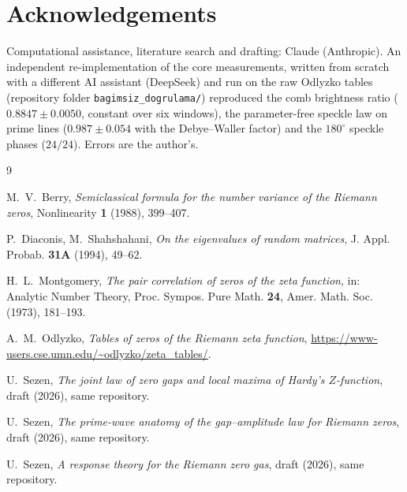 \documentclass[12pt]{amsart}
\begin{document}
\section*{Acknowledgements}

Computational assistance, literature search and drafting: Claude
(Anthropic). An independent re-implementation of the core measurements, written from
scratch with a different AI assistant (DeepSeek) and run on the raw
Odlyzko tables (repository folder \texttt{bagimsiz\_dogrulama/}) reproduced the comb brightness ratio
($0.8847 \pm 0.0050$, constant over six windows), the parameter-free
speckle law on prime lines ($0.987 \pm 0.054$ with the Debye--Waller
factor) and the $180^\circ$ speckle phases ($24/24$). Errors are the
author's.

\begin{thebibliography}{9}

 M.~V.~Berry, \emph{Semiclassical formula for the number
variance of the Riemann zeros}, Nonlinearity \textbf{1} (1988), 399--407.

 P.~Diaconis, M.~Shahshahani, \emph{On the eigenvalues of
random matrices}, J. Appl. Probab. \textbf{31A} (1994), 49--62.

 H.~L.~Montgomery, \emph{The pair correlation of
zeros of the zeta function}, in: Analytic Number Theory, Proc. Sympos.
Pure Math. \textbf{24}, Amer. Math. Soc. (1973), 181--193.

 A.~M.~Odlyzko, \emph{Tables of zeros of the
Riemann zeta function},
\url{https://www-users.cse.umn.edu/~odlyzko/zeta_tables/}.

 U.~Sezen, \emph{The joint law of zero gaps and local
maxima of Hardy's $Z$-function}, draft (2026), same repository.

 U.~Sezen, \emph{The prime-wave anatomy of the
gap--amplitude law for Riemann zeros}, draft (2026), same repository.

 U.~Sezen, \emph{A response theory for the Riemann
zero gas}, draft (2026), same repository.

\end{thebibliography}
\end{document}
